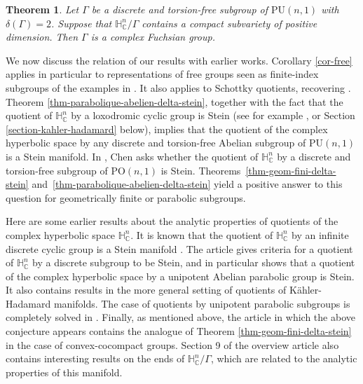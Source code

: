 \documentclass[JEP,XML,SOM,Unicode,NoEqCountersInSection,published]{cedram}
\newtheorem{theoremIntro}{Theorem}
\theoremstyle{definition}
\newcommand{\C}{\mathbb{C}}
\newcommand{\HNC}{\mathbb{H}^{n}_{\C}}
\newcommand{\PU}{\mathrm{PU}}
\newcommand{\PO}{\mathrm{PO}}
\def\C{\mathbb{C}}
\newcommand{\HNC}{\mathbb{H}^{n}_{\C}}
\newcommand{\PU}{\mathrm{PU}}
\begin{document}
\begin{theoremIntro}\label{thm-delta2}
Let $\Gamma$ be a discrete and torsion-free subgroup of $\PU(n,1)$ with $\delta(\Gamma)=2$. Suppose that $\HNC/\Gamma$ contains a compact subvariety of positive dimension. Then $\Gamma$ is a complex Fuchsian group.
\end{theoremIntro}

We now discuss the relation of our results with earlier works. Corollary \ref{cor-free} applies in particular to representations of free groups seen as finite-index subgroups of the examples in \cite{goldmanComplexHyperbolicIdeal1992,falbelModuliSpaceModular2003}. It also applies to Schottky quotients, recovering \cite[Th.\,4.3]{miebachSchottkyGroupActions2018}. Theorem \ref{thm-parabolique-abelien-delta-stein}, together with the fact that the quotient of $\HNC$ by a loxodromic cyclic group is Stein (see for example \cite{defabritiisFamilyComplexManifolds1998manuel}, \cite{chenDiscreteGroupsHolomorphic2013} or Section \ref{section-kahler-hadamard} below), implies that the quotient of the complex hyperbolic space by any discrete and torsion-free Abelian subgroup of $\PU(n,1)$ is a Stein manifold. In \cite{chenDiscreteGroupsHolomorphic2013}, Chen asks whether the quotient of $\HNC$ by a discrete and torsion-free subgroup of $\PO(n,1)$ is Stein. Theorems~\ref{thm-geom-fini-delta-stein} and~\ref{thm-parabolique-abelien-delta-stein} yield a positive answer to this question for geometrically finite or parabolic subgroups.

Here are some earlier results about the analytic properties of quotients of the complex hyperbolic space $\HNC$. It is known that the quotient of $\HNC$ by an infinite discrete cyclic group is a Stein manifold \cite{defabritiisFamilyComplexManifolds1998manuel,defabritiisQuotientsUnitBall2001manuel,miebachQuotientsBoundedHomogeneous2010}. The article \cite{chenDiscreteGroupsHolomorphic2013} gives criteria for a quotient of $\HNC$ by a discrete subgroup to be Stein, and in particular shows that a quotient of the complex hyperbolic space by a unipotent Abelian parabolic group is Stein. It also contains results in the more general setting of quotients of Kähler-Hadamard manifolds. The case of quotients by unipotent parabolic subgroups is completely solved in \cite{miebachQuotientsBoundedHomogeneous2024}. Finally, as mentioned above, the article \cite{deyNoteComplexhyperbolicKleinian2020} in which the above conjecture appears contains the analogue of Theorem \ref{thm-geom-fini-delta-stein} in the case of convex-cocompact groups. Section 9 of the overview article \cite{kapovichSurveyComplexHyperbolic2022} also contains interesting results on the ends of $\HNC/\Gamma$, which are related to the analytic properties of this manifold.
\end{document}
